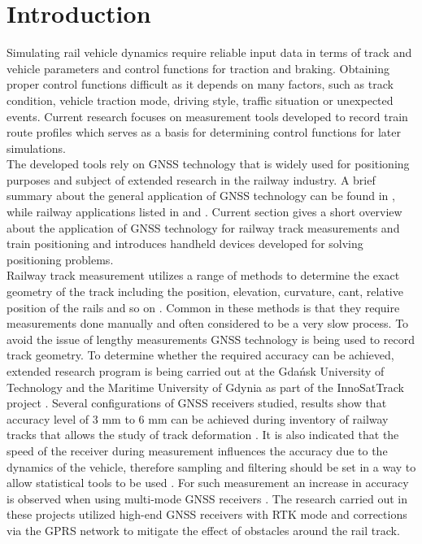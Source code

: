 \documentclass{article}
\begin{document}
	\section{Introduction}
		Simulating rail vehicle dynamics require reliable input data in terms of track and vehicle parameters and control functions for traction and braking. Obtaining proper control functions difficult as it depends on many factors, such as track condition, vehicle traction mode, driving style, traffic situation or unexpected events. Current research focuses on measurement tools developed to record train route profiles which serves as a basis for determining control functions for later simulations. \\
		The developed tools rely on GNSS technology that is widely used for positioning purposes and subject of extended research in the railway industry. A brief summary about the general application of GNSS technology can be found in \cite{GNSSApplicationsWikipedia}, \cite{GNSSApplicationsNavipedia} while railway applications listed in \cite{RailApplicationsNavipedia} and \cite{salmiInventionsUtilizingSatellite2009}. Current section gives a short overview about the application of GNSS technology for railway track measurements and train positioning and introduces handheld devices developed for solving positioning problems.\\
		Railway track measurement utilizes a range of methods to determine the exact geometry of the track including the position, elevation, curvature, cant, relative position of the rails and so on \cite{MeasuringTestingEquipment}. Common in these methods is that they require measurements done manually and often considered to be a very slow process. To avoid the issue of lengthy measurements GNSS technology is being used to record track geometry. To determine whether the required accuracy can be achieved, extended research program is being carried out at the Gda\'{n}sk University of Technology and the Maritime University of Gdynia as part of the InnoSatTrack project \cite{InnoSatTrackFacultyElectrical}. Several configurations of GNSS receivers studied, results show that accuracy level of 3 mm to 6 mm can be achieved during inventory of railway tracks that allows the study of track deformation \cite{spechtAnalysisTramTracks2017}. It is also indicated that the speed of the receiver during measurement influences the accuracy due to the dynamics of the vehicle, therefore sampling and filtering should be set in a way to allow statistical tools to be used \cite{spechtVerificationGnssMeasurements2020}. For such measurement an increase in accuracy is observed when using multi-mode GNSS receivers \cite{spechtTestingPositioningAccuracy2020}. The research carried out in these projects utilized high-end GNSS receivers with RTK mode and corrections via the GPRS network to mitigate the effect of obstacles around the rail track.\\
\end{document}
